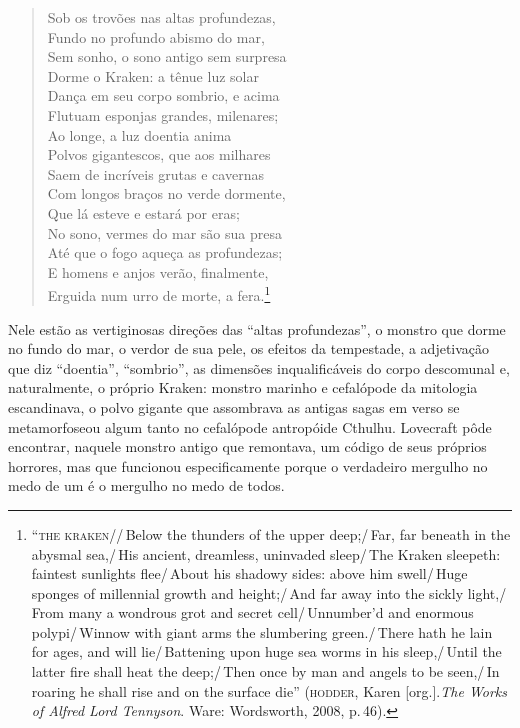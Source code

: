 \begin{quote}\noindent
Sob os trovões nas altas profundezas,\\
Fundo no profundo abismo do mar,\\
Sem sonho, o sono antigo sem surpresa\\
Dorme o Kraken: a tênue luz solar\\
Dança em seu corpo sombrio, e acima\\
Flutuam esponjas grandes, milenares;\\
Ao longe, a luz doentia anima\\
Polvos gigantescos, que aos milhares\\
Saem de incríveis grutas e cavernas\\
Com longos braços no verde dormente,\\
Que lá esteve e estará por eras;\\
No sono, vermes do mar são sua presa\\
Até que o fogo aqueça as profundezas;\\
E homens e anjos verão, finalmente,\\
Erguida num urro de morte, a fera.\footnote{``\textsc{the kraken}//\,Below the
  thunders of the upper deep;/\,Far, far beneath in the abysmal sea,/\,His
  ancient, dreamless, uninvaded sleep/\,The Kraken sleepeth: faintest
  sunlights flee/\,About his shadowy sides: above him swell/\,Huge sponges
  of millennial growth and height;/\,And far away into the sickly
  light,/\,From many a wondrous grot and secret cell/\,Unnumber'd and
  enormous polypi/\,Winnow with giant arms the slumbering green./\,There
  hath he lain for ages, and will lie/\,Battening upon huge sea worms in
  his sleep,/\,Until the latter fire shall heat the deep;/\,Then once by man
  and angels to be seen,/\,In roaring he shall rise and on the surface
  die'' (\textsc{hodder}, Karen [org.].\emph{The Works of Alfred Lord Tennyson}. 
  Ware: Wordsworth, 2008, p.\,46).}
\end{quote}

Nele estão as vertiginosas direções das ``altas profundezas'', o monstro
que dorme no fundo do mar, o verdor de sua pele, os efeitos da
tempestade, a adjetivação que diz ``doentia'', ``sombrio'', as dimensões
inqualificáveis do corpo descomunal e, naturalmente, o próprio Kraken:
monstro marinho e cefalópode da mitologia escandinava, o polvo gigante
que assombrava as antigas sagas em verso se metamorfoseou algum tanto no
cefalópode antropóide Cthulhu. Lovecraft pôde encontrar, naquele monstro
antigo que remontava, um código de seus próprios horrores, mas que
funcionou especificamente porque o verdadeiro mergulho no medo de um é o
mergulho no medo de todos.

